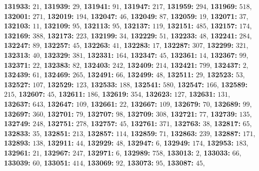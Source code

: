\textsf{\bfseries 131933:} $21$, \textsf{\bfseries 131939:} $29$, \textsf{\bfseries 131941:} $91$, \textsf{\bfseries 131947:} $217$, \textsf{\bfseries 131959:} $294$, \textsf{\bfseries 131969:} $518$, \textsf{\bfseries 132001:} $271$, \textsf{\bfseries 132019:} $194$, \textsf{\bfseries 132047:} $46$, \textsf{\bfseries 132049:} $87$, \textsf{\bfseries 132059:} $19$, \textsf{\bfseries 132071:} $37$, \textsf{\bfseries 132103:} $11$, \textsf{\bfseries 132109:} $95$, \textsf{\bfseries 132113:} $95$, \textsf{\bfseries 132137:} $119$, \textsf{\bfseries 132151:} $485$, \textsf{\bfseries 132157:} $174$, \textsf{\bfseries 132169:} $388$, \textsf{\bfseries 132173:} $223$, \textsf{\bfseries 132199:} $34$, \textsf{\bfseries 132229:} $51$, \textsf{\bfseries 132233:} $48$, \textsf{\bfseries 132241:} $284$, \textsf{\bfseries 132247:} $89$, \textsf{\bfseries 132257:} $45$, \textsf{\bfseries 132263:} $41$, \textsf{\bfseries 132283:} $17$, \textsf{\bfseries 132287:} $307$, \textsf{\bfseries 132299:} $321$, \textsf{\bfseries 132313:} $40$, \textsf{\bfseries 132329:} $381$, \textsf{\bfseries 132331:} $164$, \textsf{\bfseries 132347:} $45$, \textsf{\bfseries 132361:} $14$, \textsf{\bfseries 132367:} $99$, \textsf{\bfseries 132371:} $22$, \textsf{\bfseries 132383:} $82$, \textsf{\bfseries 132403:} $242$, \textsf{\bfseries 132409:} $214$, \textsf{\bfseries 132421:} $799$, \textsf{\bfseries 132437:} $2$, \textsf{\bfseries 132439:} $61$, \textsf{\bfseries 132469:} $265$, \textsf{\bfseries 132491:} $66$, \textsf{\bfseries 132499:} $48$, \textsf{\bfseries 132511:} $29$, \textsf{\bfseries 132523:} $53$, \textsf{\bfseries 132527:} $107$, \textsf{\bfseries 132529:} $123$, \textsf{\bfseries 132533:} $188$, \textsf{\bfseries 132541:} $580$, \textsf{\bfseries 132547:} $166$, \textsf{\bfseries 132589:} $215$, \textsf{\bfseries 132607:} $45$, \textsf{\bfseries 132611:} $186$, \textsf{\bfseries 132619:} $354$, \textsf{\bfseries 132623:} $127$, \textsf{\bfseries 132631:} $131$, \textsf{\bfseries 132637:} $643$, \textsf{\bfseries 132647:} $109$, \textsf{\bfseries 132661:} $22$, \textsf{\bfseries 132667:} $109$, \textsf{\bfseries 132679:} $70$, \textsf{\bfseries 132689:} $99$, \textsf{\bfseries 132697:} $360$, \textsf{\bfseries 132701:} $79$, \textsf{\bfseries 132707:} $98$, \textsf{\bfseries 132709:} $308$, \textsf{\bfseries 132721:} $77$, \textsf{\bfseries 132739:} $135$, \textsf{\bfseries 132749:} $248$, \textsf{\bfseries 132751:} $278$, \textsf{\bfseries 132757:} $45$, \textsf{\bfseries 132761:} $371$, \textsf{\bfseries 132763:} $38$, \textsf{\bfseries 132817:} $65$, \textsf{\bfseries 132833:} $35$, \textsf{\bfseries 132851:} $213$, \textsf{\bfseries 132857:} $114$, \textsf{\bfseries 132859:} $71$, \textsf{\bfseries 132863:} $239$, \textsf{\bfseries 132887:} $171$, \textsf{\bfseries 132893:} $138$, \textsf{\bfseries 132911:} $44$, \textsf{\bfseries 132929:} $48$, \textsf{\bfseries 132947:} $6$, \textsf{\bfseries 132949:} $174$, \textsf{\bfseries 132953:} $183$, \textsf{\bfseries 132961:} $21$, \textsf{\bfseries 132967:} $247$, \textsf{\bfseries 132971:} $6$, \textsf{\bfseries 132989:} $758$, \textsf{\bfseries 133013:} $2$, \textsf{\bfseries 133033:} $66$, \textsf{\bfseries 133039:} $60$, \textsf{\bfseries 133051:} $414$, \textsf{\bfseries 133069:} $92$, \textsf{\bfseries 133073:} $95$, \textsf{\bfseries 133087:} $45$, 
